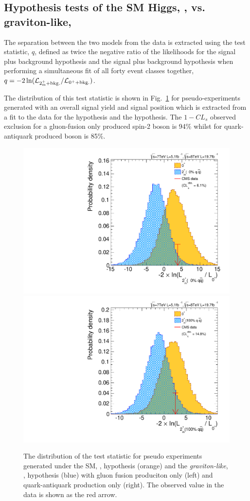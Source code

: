 \subsection{Hypothesis tests of the SM Higgs, \zerop, vs. graviton-like, \twomp}
\label{sec:spin_separation}

The separation between the two models from the data is extracted using the test statistic, $q$, defined as twice the negative ratio 
of the likelihoods for the \zerop signal plus background hypothesis and the \twomp signal plus background hypothesis when 
performing a simultaneous fit of all forty event classes together, $q=-2\,{\ln({\cal L}_{2^{+}_\mathrm{m} + \mathrm{bkg.}}/{\cal
L}_{0^+ + \mathrm{bkg.}})}$.

The distribution of this test statistic is shown in 
Fig.~\ref{fig:separation} for pseudo-experiments generated with an overall signal yield and signal position which is extracted from a fit to the data for
the \zerop hypothesis 
and the \twomp hypothesis. The $1-CL_{s}$ observed exclusion for a gluon-fusion only produced spin-2 boson is 94\% whilst for quark-antiquark produced boson is 85\%. 

\begin{figure}
  \begin{center}
    \includegraphics[width=0.49\linewidth]{results/plots/2pm0.pdf}
    \includegraphics[width=0.49\linewidth]{results/plots/2pm1.pdf}
    \caption[Distributions of the test statistic for different spin hypotheses compared to the \acs{SM}]{The distribution of the test statistic for pseudo experiments generated under the SM, \zerop, hypothesis (orange) and the \emph{graviton-like}, \twomp, hypothesis (blue) with gluon fusion produciton only (left) and quark-antiquark production only (right). The observed value in the data is shown as the red arrow.}
    \label{fig:separation}
  \end{center}
\end{figure}

